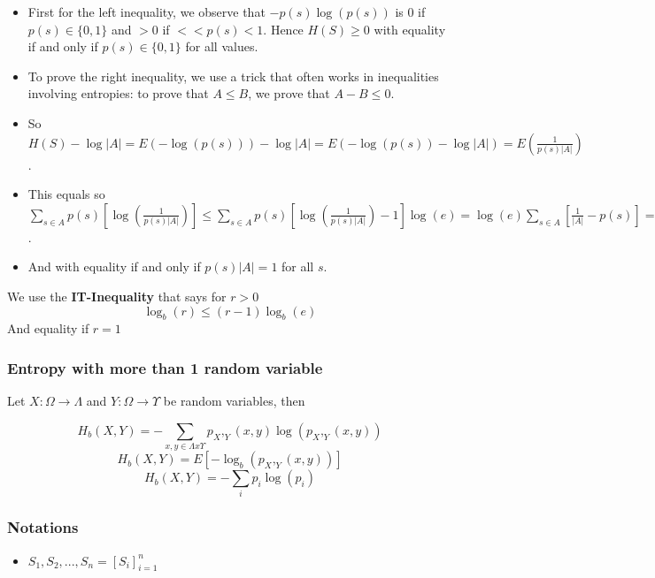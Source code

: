 \documentclass{article}
\begin{document}
\begin{tcolorbox}[width=12.1cm]
\begin{itemize}
\item First for the left inequality, we observe that $ -p(s)\log(p(s)) $ is 0 if $ p(s) \in \{0,1\} $ and $ > 0 $ if $ < < p(s) < 1 $. Hence $ H(S) \geq 0 $ with equality if and only if $ p(s) \in \{0,1\} $ for all values.
\item To prove the right inequality, we use a trick that often works in inequalities involving entropies: to prove that $ A \leq B $, we prove that $ A - B \leq 0 $.
\item So $ H(S) - \log|A| = E(-\log(p(s))) - \log|A| = E(-\log(p(s)) - \log|A|) = E(\frac{1}{p(s)|A|}) $.
\item This equals so $ \sum_{s \in A} p(s)[\log(\frac{1}{p(s)|A|})] \leq \sum_{s \in A} p(s)[\log(\frac{1}{p(s)|A|}) - 1]\log(e) = \log(e)\sum_{s \in A} [\frac{1}{|A|} - p(s)] = \log(e)(1-1) = 0 $.
\item And with equality if and only if $ p(s)|A| = 1 $ for all $ s $.
\end{itemize}
\end{tcolorbox}
We use the \textbf{IT-Inequality} that says for $ r > 0 $
\begin{equation}
\log_{b}(r) \leq (r-1)\log_{b}(e)
\end{equation}
And equality if $ r = 1 $

\subsubsection{Entropy with more than 1 random variable} Let $ X: \Omega \rightarrow \Lambda $ and $ Y: \Omega \rightarrow \Upsilon $ be random variables, then 
\begin{tcolorbox}[sharp corners, colback=green!30, colframe=green!80!blue, title=Entropy with Multiple Random Variables]
\begin{equation}
H_b(X, Y) = - \sum_{x, y \in \Lambda x \Upsilon}p_X,_Y(x, y)\log(p_X,_Y(x, y))
\end{equation}
\begin{equation}
H_b(X, Y) = E[-\log_b(p_X,_Y(x, y))]
\end{equation}
\begin{equation}
H_b(X, Y) = - \sum_{i}p_i\log(p_i)
\end{equation}
\end{tcolorbox}

\subsubsection{Notations}
\begin{itemize}
\item $ S_1, S_2, ..., S_n = [S_i]_{i=1}^{n} $
\end{itemize}
\end{document}
